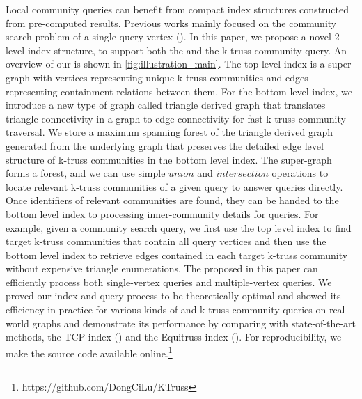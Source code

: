 Local community queries can benefit from compact index structures constructed from pre-computed results. Previous works mainly focused on the community search problem of a single query vertex (\cite{huang2014querying, akbas2017truss}). In this paper, we propose a novel 2-level index structure, to support both the \toplevelprob{} and the \bottomlevelprob{} k-truss community query. An overview of our \twolevelindex{} is shown in \autoref{fig:illustration_main}. The top level index is a super-graph with vertices representing unique k-truss communities and edges representing containment relations between them. For the bottom level index, we introduce a new type of graph called triangle derived graph that translates triangle connectivity in a graph to edge connectivity for fast k-truss community traversal. We store a maximum spanning forest of the triangle derived graph generated from the underlying graph that preserves the detailed edge level structure of k-truss communities in the bottom level index. 
The super-graph forms a forest, and we can use simple $union$ and $intersection$ operations to locate relevant k-truss communities of a given query to answer \toplevelprob{} queries directly. Once identifiers of relevant communities are found, they can be handed to the bottom level index to processing inner-community details for \bottomlevelprob{} queries.
For example, given a community search query, we first use the top level index to find target k-truss communities that contain all query vertices and then use the bottom level index to retrieve edges contained in each target k-truss community without expensive triangle enumerations. The \twolevelindex{} proposed in this paper can efficiently process both single-vertex queries and multiple-vertex queries. We proved our index and query process to be theoretically optimal and showed its efficiency in practice for various kinds of \toplevelprob{} and \bottomlevelprob{} k-truss community queries on real-world graphs and demonstrate its performance by comparing with state-of-the-art methods, the TCP index (\cite{huang2014querying}) and the Equitruss index (\cite{akbas2017truss}). For reproducibility, we make the source code available online.\footnote{https://github.com/DongCiLu/KTruss}


